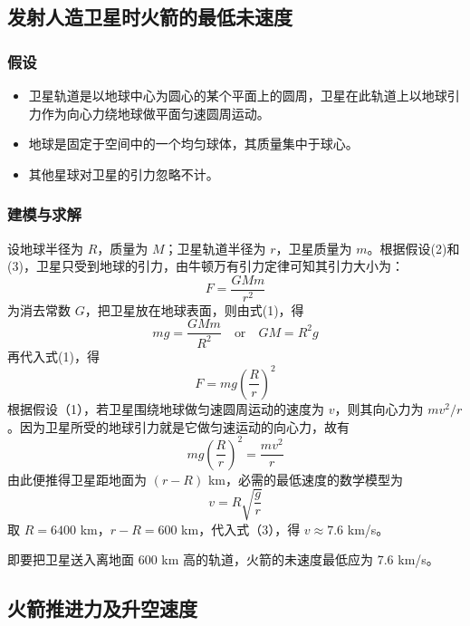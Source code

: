 \documentclass[a4,10pt,zihao=-4]{ctexart}
\begin{document}
\subsection{发射人造卫星时火箭的最低未速度}

\subsubsection{假设}

\begin{itemize}
    \item 卫星轨道是以地球中心为圆心的某个平面上的圆周，卫星在此轨道上以地球引力作为向心力绕地球做平面匀速圆周运动。
    \item 地球是固定于空间中的一个均匀球体，其质量集中于球心。
    \item 其他星球对卫星的引力忽略不计。
\end{itemize}

\subsubsection{建模与求解}

设地球半径为 $R$，质量为 $M$；卫星轨道半径为 $r$，卫星质量为 $m$。根据假设(2)和(3)，卫星只受到地球的引力，由牛顿万有引力定律可知其引力大小为：
\begin{equation}
F = \frac{GMm}{r^2}
\end{equation}
为消去常数 $G$，把卫星放在地球表面，则由式(1)，得
\begin{equation*}
mg = \frac{GMm}{R^2} \quad \text{or} \quad GM=R^2g
\end{equation*}
再代入式(1)，得
\begin{equation}
F = mg\left(\frac{R}{r}\right)^2
\end{equation}
根据假设（1），若卫星围绕地球做匀速圆周运动的速度为 $v$，则其向心力为 $mv^2/r$ 。因为卫星所受的地球引力就是它做匀速运动的向心力，故有
\begin{equation*}
mg\left(\frac{R}{r}\right)^2 = \frac{mv^2}{r}
\end{equation*}
由此便推得卫星距地面为 $(r-R)$ km，必需的最低速度的数学模型为
\begin{equation}
v = R\sqrt{\frac{g}{r}}
\end{equation}
取 $R = 6400$ km，$r-R=600$ km，代入式（3），得 $v \approx 7.6$ km/s。

即要把卫星送入离地面 600 km 高的轨道，火箭的未速度最低应为 7.6 km/s。

\subsection{火箭推进力及升空速度}
\end{document}
